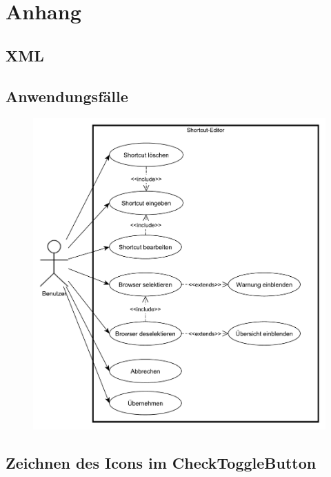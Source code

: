 \section{Anhang}

\subsection{XML}
\label{xml}



\subsection{Anwendungsfälle}
\label{usecase}

\begin{figure}[H]
\includegraphics[width=\linewidth]{../graphic/diagrams/UC_Anwendungsfall/Anwendungsfall}
\end{figure}

\subsection{Zeichnen des Icons im CheckToggleButton}
\label{CheckToggleButton}


